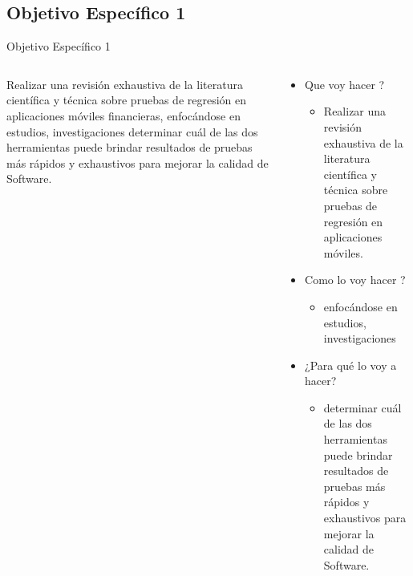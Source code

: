 \documentclass{beamer}
\begin{document}
\subsection{Objetivo Específico 1 }
\begin{frame}{Objetivo Específico 1 }
  \begin{columns}
    \begin{column}{0.5\textwidth}
    \justify
      Realizar una revisión exhaustiva de la literatura científica y técnica sobre pruebas de regresión en aplicaciones móviles financieras, enfocándose en estudios, investigaciones determinar cuál de las dos herramientas puede brindar resultados de pruebas más rápidos y exhaustivos para mejorar la calidad de Software.
    \end{column}
    \begin{column}{0.55\textwidth}
      \begin{itemize}
          \item Que voy hacer ?
          \begin{itemize}
              \item Realizar una revisión exhaustiva de la literatura científica y técnica sobre pruebas de regresión en aplicaciones móviles.
          \end{itemize}
          \item Como lo voy hacer ?
          \begin{itemize}
              \item enfocándose en estudios, investigaciones 
          \end{itemize}
          \item ¿Para qué lo voy a hacer?
          \begin{itemize}
              \item determinar cuál de las dos herramientas puede brindar resultados de pruebas más rápidos y exhaustivos para mejorar la calidad de Software.
          \end{itemize}
      \end{itemize}
    \end{column}
  \end{columns}
\end{frame}
\end{document}
